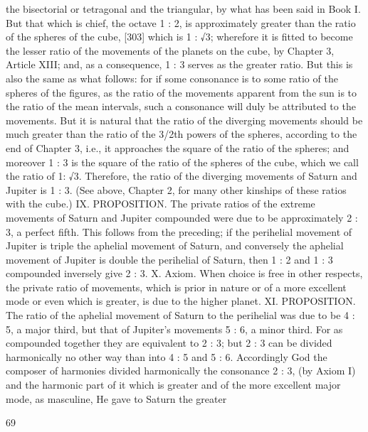 \documentclass{article}
\begin{document}
the bisectorial or tetragonal and the triangular, by what has been said in
Book I. But that which is chief, the octave 1 : 2, is approximately greater
than the ratio of the spheres of the cube, [303] which is 1 : √3; wherefore
it is fitted to become the lesser ratio of the movements of the planets on
the cube, by Chapter 3, Article XIII; and, as a consequence, 1 : 3 serves as
the greater ratio.
But this is also the same as what follows: for if some consonance is to
some ratio of the spheres of the figures, as the ratio of the movements
apparent from the sun is to the ratio of the mean intervals, such a
consonance will duly be attributed to the movements. But it is natural
that the ratio of the diverging movements should be much greater than
the ratio of the 3/2th powers of the spheres, according to the end of
Chapter 3, i.e., it approaches the square of the ratio of the spheres; and
moreover 1 : 3 is the square of the ratio of the spheres of the cube, which
we call the ratio of 1: √3. Therefore, the ratio of the diverging movements
of Saturn and Jupiter is 1 : 3. (See above, Chapter 2, for many other
kinships of these ratios with the cube.)
IX. PROPOSITION. The private ratios of the extreme movements of
Saturn and Jupiter compounded were due to be approximately 2 : 3, a
perfect fifth.
This follows from the preceding; if the perihelial movement of Jupiter is
triple the aphelial movement of Saturn, and conversely the aphelial
movement of Jupiter is double the perihelial of Saturn, then 1 : 2 and 1 :
3 compounded inversely give 2 : 3.
X. Axiom. When choice is free in other respects, the private ratio of
movements, which is prior in nature or of a more excellent mode or even
which is greater, is due to the higher planet.
XI. PROPOSITION. The ratio of the aphelial movement of Saturn to the
perihelial was due to be 4 : 5, a major third, but that of Jupiter's
movements 5 : 6, a minor third.
For as compounded together they are equivalent to 2 : 3; but 2 : 3 can be
divided harmonically no other way than into 4 : 5 and 5 : 6. Accordingly
God the composer of harmonies divided harmonically the consonance 2 :
3, (by Axiom I) and the harmonic part of it which is greater and of the
more excellent major mode, as masculine, He gave to Saturn the greater


69
\end{document}
